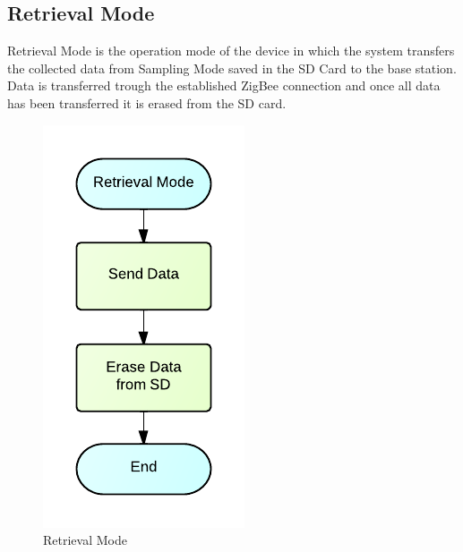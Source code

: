 \subsection{Retrieval Mode}
Retrieval Mode is the operation mode of the device in which the system transfers the collected data from Sampling Mode saved in the SD Card to the base station. Data is transferred trough the established ZigBee connection and once all data has been transferred it is erased from the SD card.
\begin{figure}[H]
	\centering
	\includegraphics[scale=1.0]{img/RetrievalMode}
	\caption{Retrieval Mode \label{fig:retrivalMode}}
\end{figure}



